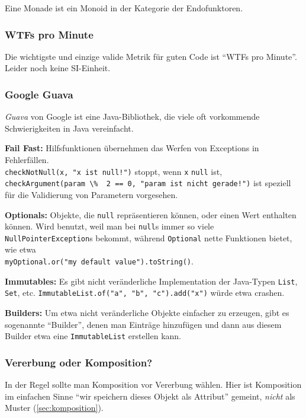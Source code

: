 \documentclass{panikzettel}
\begin{document}
Eine Monade ist ein Monoid in der Kategorie der Endofunktoren. %

\subsubsection{WTFs pro Minute}
Die wichtigste und einzige valide Metrik für guten Code ist ``WTFs pro Minute''.
Leider noch keine SI-Einheit.

\subsubsection{Google Guava}
\label{sec:guava}

\emph{Guava} von Google ist eine Java-Bibliothek, die viele oft vorkommende Schwierigkeiten in Java vereinfacht.

\textbf{Fail Fast:} Hilfsfunktionen übernehmen das Werfen von Exceptions in Fehlerfällen. \\
\lstinline{checkNotNull(x, "x ist null!")} stoppt, wenn \lstinline{x} \lstinline{null} ist, \\
\lstinline{checkArgument(param \%  2 == 0, "param ist nicht gerade!")} ist speziell für die Validierung von Parametern vorgesehen.

\textbf{Optionals:} Objekte, die \lstinline{null} repräsentieren können, oder einen Wert enthalten können.
Wird benutzt, weil man bei \lstinline{null}s immer so viele \lstinline{NullPointerException}s bekommt, während \lstinline{Optional} nette Funktionen bietet, wie etwa \\ \lstinline{myOptional.or("my default value").toString()}.

\textbf{Immutables:} Es gibt nicht veränderliche Implementation der Java-Typen \lstinline{List}, \lstinline{Set}, etc. \lstinline{ImmutableList.of("a", "b", "c").add("x")} würde etwa crashen.

\textbf{Builders:} Um etwa nicht veränderliche Objekte einfacher zu erzeugen, gibt es sogenannte ``Builder'', denen man Einträge hinzufügen und dann aus diesem Builder etwa eine \lstinline{ImmutableList} erstellen kann.

\subsubsection{Vererbung oder Komposition?}

In der Regel sollte man Komposition vor Vererbung wählen.
Hier ist Komposition im einfachen Sinne ``wir speichern dieses Objekt als Attribut'' gemeint, \emph{nicht} als Muster (\ref{sec:komposition}).
\end{document}
